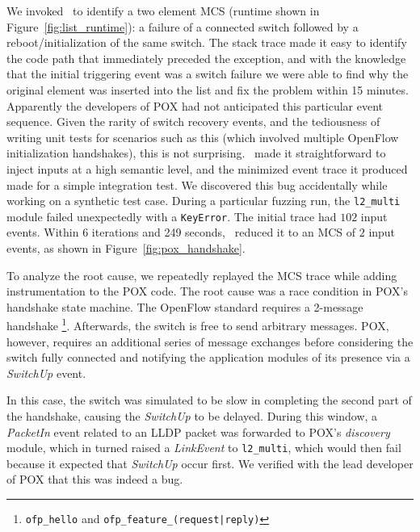 {We invoked \projectname~to identify a two element MCS (runtime
shown in Figure~\ref{fig:list_runtime}):
a failure of a connected switch followed by a reboot/initialization of the same switch.
The stack trace made it easy to identify the code path that
immediately preceded the exception, and with
the knowledge that the initial triggering event was a switch failure we were able to
find why the original element was inserted into the list and fix the
problem within 15 minutes.\\[0.5ex]

Apparently the developers of POX had not anticipated this particular event
sequence. Given the rarity of switch recovery events, and the tediousness of
writing unit tests for scenarios such as this
(which involved multiple OpenFlow initialization handshakes), this is not
surprising.
\projectname~made it straightforward to inject inputs
at a high semantic level,
and the minimized event
trace it produced made for a simple integration test.
} %
 We discovered this bug accidentally
while working on a synthetic test case. During a particular fuzzing run, the
\verb=l2_multi= module failed unexpectedly with a \verb=KeyError=. The initial trace
had $102$ input events. Within 6 iterations and 249 seconds,
\projectname~reduced it to an MCS of $2$ input events, as shown in
Figure~\ref{fig:pox_handshake}.

To analyze the root cause, we repeatedly replayed the MCS trace while adding
instrumentation to the POX code. The root cause was a race
condition in POX's handshake state machine. The OpenFlow standard
requires a 2-message handshake \footnote{\texttt{ofp\_hello} and
\texttt{ofp\_feature\_(request|reply)}}. Afterwards, the switch is free to send
arbitrary messages. POX, however, requires an additional series of message
exchanges before considering the switch fully connected and notifying the
application modules of its presence via a \emph{SwitchUp} event.

In this case, the switch was simulated to be slow in completing the second part
of the handshake, causing the \emph{SwitchUp} to be delayed. During this window,
a \emph{PacketIn} event related to an LLDP packet was forwarded to POX's
\emph{discovery} module, which in turned raised a \emph{LinkEvent} to
\verb=l2_multi=, which would then fail because it expected that \emph{SwitchUp} occur first.
We verified with the lead developer of POX that this was indeed a bug.

